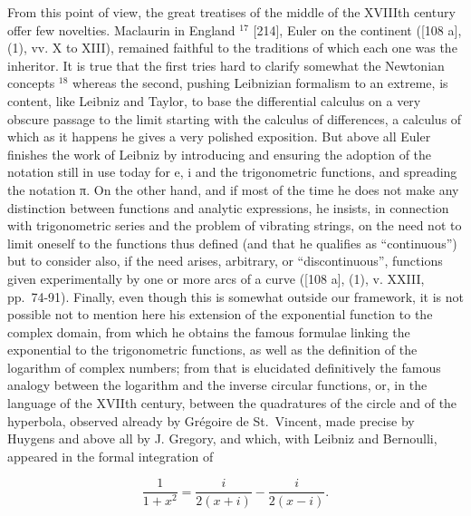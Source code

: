 From this point of view, the great treatises of the middle of the XVIIIth century offer few novelties. Maclaurin in England \(^{17}\) {[}214{]}, Euler on the continent ({[}108 a{]}, (1), vv. X to XIII), remained faithful to the traditions of which each one was the inheritor. It is true that the first tries hard to clarify somewhat the Newtonian concepts \(^{18}\) whereas the second, pushing Leibnizian formalism to an extreme, is content, like Leibniz and Taylor, to base the differential calculus on a very obscure passage to the limit starting with the calculus of differences, a calculus of which as it happens he gives a very polished exposition. But above all Euler finishes the work of Leibniz by introducing and ensuring the adoption of the notation still in use today for e, i and the trigonometric functions, and spreading the notation π. On the other hand, and if most of the time he does not make any distinction between functions and analytic expressions, he insists, in connection with trigonometric series and the problem of vibrating strings, on the need not to limit oneself to the functions thus defined (and that he qualifies as ``continuous'') but to consider also, if the need arises, arbitrary, or ``discontinuous'', functions given experimentally by one or more arcs of a curve ({[}108 a{]}, (1), v. XXIII, pp.~74-91). Finally, even though this is somewhat outside our framework, it is not possible not to mention here his extension of the exponential function to the complex domain, from which he obtains the famous formulae linking the exponential to the trigonometric functions, as well as the definition of the logarithm of complex numbers; from that is elucidated definitively the famous analogy between the logarithm and the inverse circular functions, or, in the language of the XVIIth century, between the quadratures of the circle and of the hyperbola, observed already by Grégoire de St.~Vincent, made precise by Huygens and above all by J. Gregory, and which, with Leibniz and Bernoulli, appeared in the formal integration of

\[
\frac {1}{1 + x ^ {2}} = \frac {i}{2 (x + i)} - \frac {i}{2 (x - i)}.
\]

